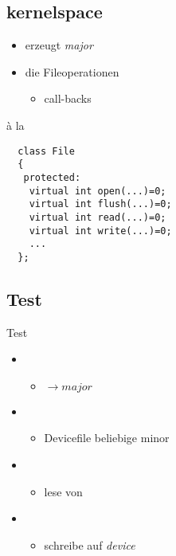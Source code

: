 \subsection{kernelspace}
\begin{frame}[fragile]{}
 \begin{itemize}
  \item erzeugt {\em major}
  \item {} die Fileoperationen
  \begin{itemize}
   \item call-backs
  \end{itemize}
 \end{itemize}
 \begin{block}{à la \CPP}
 \begin{lstlisting}
  class File
  {
   protected:
    virtual int open(...)=0;
    virtual int flush(...)=0;
    virtual int read(...)=0;
    virtual int write(...)=0;
    ...
  };
 \end{lstlisting}
 \end{block}
\end{frame}

\subsection{Test}
\begin{frame}{Test}
 \begin{itemize}
  \item {}
  \begin{itemize}
   \item $\to major$
  \end{itemize}
  \item {}
  \begin{itemize}
   \item Devicefile beliebige minor
  \end{itemize}
  \item {}
  \begin{itemize}
   \item lese von 
  \end{itemize}
  \item {}
  \begin{itemize}
   \item schreibe auf {\em device}
  \end{itemize}
 \end{itemize}
\end{frame}
